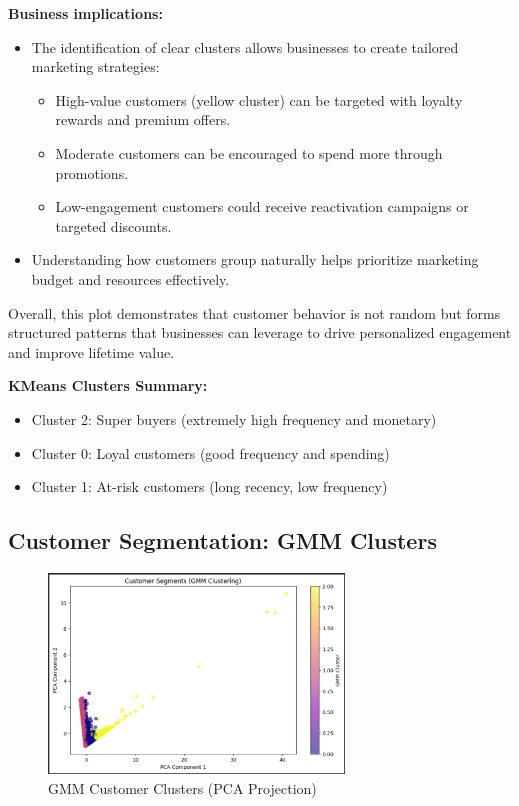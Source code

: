 \documentclass[12pt]{article}
\begin{document}
\textbf{Business implications:}
\begin{itemize}
    \item The identification of clear clusters allows businesses to create tailored marketing strategies:
    \begin{itemize}
        \item High-value customers (yellow cluster) can be targeted with loyalty rewards and premium offers.
        \item Moderate customers can be encouraged to spend more through promotions.
        \item Low-engagement customers could receive reactivation campaigns or targeted discounts.
    \end{itemize}
    \item Understanding how customers group naturally helps prioritize marketing budget and resources effectively.
\end{itemize}

\vspace{0.4cm}

Overall, this plot demonstrates that customer behavior is not random but forms structured patterns that businesses can leverage to drive personalized engagement and improve lifetime value.

\vspace{0.4cm}


\textbf{KMeans Clusters Summary:}
\begin{itemize}
    \item Cluster 2: Super buyers (extremely high frequency and monetary)
    \item Cluster 0: Loyal customers (good frequency and spending)
    \item Cluster 1: At-risk customers (long recency, low frequency)
\end{itemize}

\subsection{Customer Segmentation: GMM Clusters}

\begin{figure}[H]
    \centering
    \includegraphics[width=0.7\textwidth]{images/customers_clusters_gmm_clustering.png}
    \caption{GMM Customer Clusters (PCA Projection)}
\end{figure}
\end{document}
